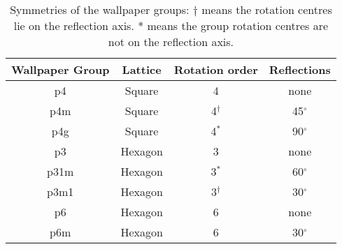 \begin{table}
        \begin{tabular}{|c|c|c|c|}
            \hline
            Wallpaper Group & Lattice & Rotation order & Reflections \\
            \hline
            p4 & Square & 4 & none\\
            p4m & Square & 4$^\dagger$ & 45$^\circ$\\
            p4g & Square & 4$^*$ & 90$^\circ$\\
            p3 & Hexagon & 3 & none\\
            p31m & Hexagon & 3$^*$ & 60$^\circ$\\
            p3m1 & Hexagon & 3$^\dagger$ & 30$^\circ$\\
            p6 & Hexagon & 6 & none\\
            p6m & Hexagon & 6 & 30$^\circ$\\
            \hline
        \end{tabular}
    \caption{Symmetries of the wallpaper groups: $\dagger$ means the rotation centres lie on the reflection axis. * means the group rotation centres are not on the reflection axis. \cite{Clark1}}
\end{table}